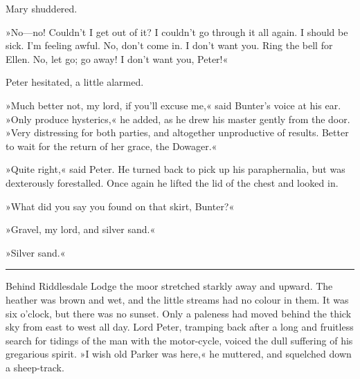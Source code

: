 Mary shuddered.

»No—no! Couldn't I get out of it? I couldn't go through it all again.  I should be sick. I'm feeling awful. No, don't come in. I don't want you. Ring the bell for Ellen. No, let go; go away! I don't want you, Peter!«

Peter hesitated, a little alarmed.

»Much better not, my lord, if you'll excuse me,« said Bunter's voice at his ear. »Only produce hysterics,« he added, as he drew his master gently from the door. »Very distressing for both parties, and altogether unproductive of results. Better to wait for the return of her grace, the Dowager.«

»Quite right,« said Peter. He turned back to pick up his paraphernalia, but was dexterously forestalled. Once again he lifted the lid of the chest and looked in.

»What did you say you found on that skirt, Bunter?«

»Gravel, my lord, and silver sand.«

»Silver sand.«

\noindent\hfil\rule{0.5\textwidth}{.4pt}\hfil

Behind Riddlesdale Lodge the moor stretched starkly away and upward.  The heather was brown and wet, and the little streams had no colour in them. It was six o'clock, but there was no sunset. Only a paleness had moved behind the thick sky from east to west all day. Lord Peter, tramping back after a long and fruitless search for tidings of the man with the motor-cycle, voiced the dull suffering of his gregarious spirit. »I wish old Parker was here,« he muttered, and squelched down a sheep-track.

